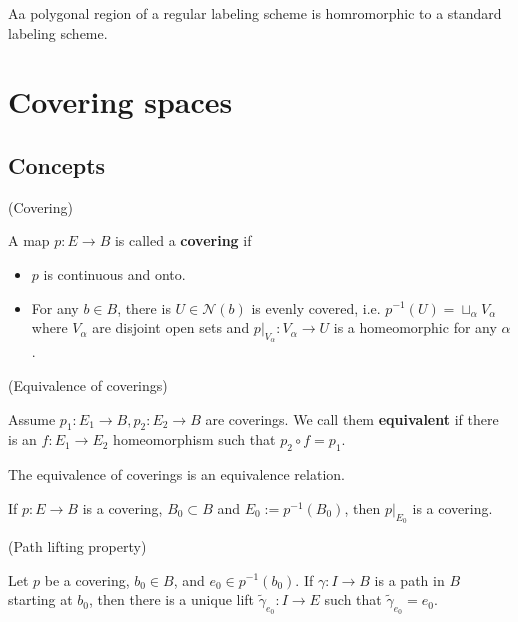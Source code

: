 \documentclass{article}
\begin{document}
\begin{theorem}
    Aa polygonal region of a regular labeling scheme is homromorphic to a standard labeling scheme.
\end{theorem}

\section{Covering spaces}

\subsection{Concepts}

\begin{definition}(Covering)\par
    A map $p:E \to B$ is called a \textbf{covering} if
    \begin{itemize}
        \item $p$ is continuous and onto.
        \item For any $b\in B$, there is $U \in \mathcal{N}(b)$ is evenly covered, i.e. $p^{-1}(U) = \sqcup_{\alpha} V_{\alpha}$ where $V_{\alpha}$ are disjoint open sets and $p|_{V_{\alpha}}:V_{\alpha} \to U$ is a homeomorphic for any $\alpha$.
    \end{itemize}
\end{definition}

\begin{definition}(Equivalence of coverings)\par
    Assume $p_1:E_1 \to B, p_2 : E_2 \to B$ are coverings. We call them \textbf{equivalent} if there is an $f:E_1 \to E_2$ homeomorphism such that $p_2 \circ f = p_1$.\par
    The equivalence of coverings is an equivalence relation.
\end{definition}

\begin{lemma}
    If $p:E\to B$ is a covering, $B_0\subset B$ and $E_0:=p^{-1}(B_0)$, then $p|_{E_0}$ is a covering.
\end{lemma}

\begin{theorem}(Path lifting property)\par
    Let $p$ be a covering, $b_0\in B$, and $e_0 \in p^{-1}(b_0)$. If $\gamma: I \to B$ is a path in $B$ starting at $b_0$, then there is a unique lift $\widetilde{\gamma}_{e_0}:I\to E$ such that $\widetilde{\gamma}_{e_0} = e_0$.
\end{theorem}
\end{document}
